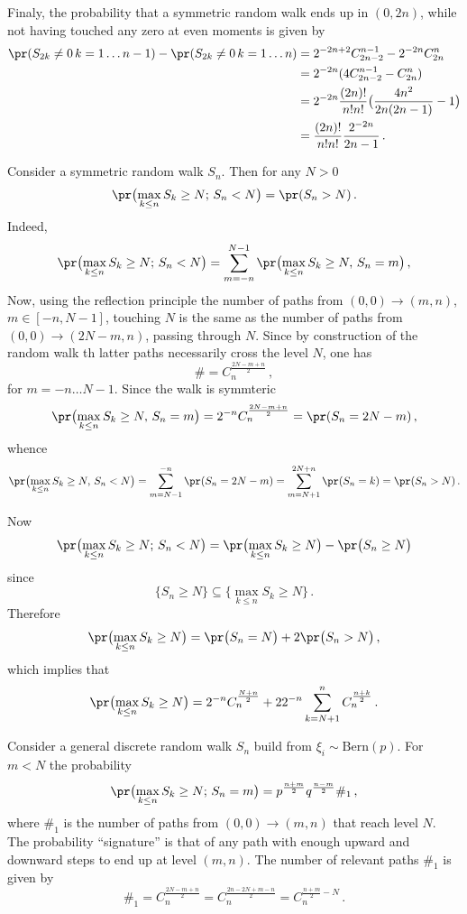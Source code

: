 Finaly, the probability that a symmetric random walk ends up in $(0,2n)$, while
not having touched any zero at even moments is given by
\begin{align*}
	\pr(S_{2k}\neq 0\,k=1\ldots n-1) - \pr(S_{2k}\neq 0\,k=1\ldots n) 
		&= 2^{-2n+2} C_{2n-2}^{n-1} - 2^{-2n} C_{2n}^n \\
		&= 2^{-2n} ( 4 C_{2n-2}^{n-1} - C_{2n}^n) \\
		&= 2^{-2n} \frac{(2n)!}{n!n!}\bigl(\frac{4 n^2}{2n(2n-1)}-1\bigr) \\
		&= \frac{(2n)!}{n!n!}\frac{2^{-2n}}{2n-1} \,.
\end{align*}

Consider a symmetric random walk $S_n$. Then for any $N > 0$
\[ \pr\bigl( \max_{k\leq n} S_k \geq N;\, S_n < N \bigr) = \pr( S_n > N ) \,. \]
Indeed,
\[ \pr\bigl( \max_{k\leq n} S_k \geq N;\, S_n < N \bigr)
	= \sum_{m=-n}^{N-1} \pr\bigl( \max_{k\leq n} S_k \geq N,\, S_n = m \bigr) \,, \]
Now, using the reflection principle the number of paths from $(0,0)\to(m,n)$, $m\in [-n,N-1]$,
touching $N$ is the same as the number of paths from $(0,0)\to (2N-m,n)$, passing
through $N$. Since by construction of the random walk th latter paths necessarily cross
the level $N$, one has
\[ \# = C_n^\frac{2N-m+n}{2} \,, \]
for $m=-n\ldots N-1$. Since the walk is symmteric 
\[ \pr\bigl( \max_{k\leq n} S_k \geq N,\, S_n = m \bigr)
	= 2^{-n} C_n^\frac{2N-m+n}{2} = \pr( S_n = 2N-m ) \,, \]
whence
\[ \pr\bigl( \max_{k\leq n} S_k \geq N,\, S_n < N \bigr)
	= \sum_{m=N-1}^{-n} \pr( S_n = 2N-m )
	= \sum_{m=N+1}^{2N+n} \pr( S_n = k )
	= \pr( S_n > N ) \,. \]

Now
\begin{align*}
	\pr\bigl( \max_{k\leq n} S_k \geq N;\, S_n < N \bigr)
		&= \pr\bigl( \max_{k\leq n} S_k \geq N \bigr)
		 - \pr\bigl( S_n \geq N \bigr) \\
\end{align*}
since 
\[ \{ S_n \geq N \} \subseteq \{ \max_{k\leq n} S_k \geq N \}\,. \]
Therefore
\[ \pr\bigl( \max_{k\leq n} S_k \geq N \bigr)
	= \pr\bigl( S_n = N \bigr) + 2\pr\bigl( S_n > N \bigr) \,, \]
which implies that
\[ \pr\bigl( \max_{k\leq n} S_k \geq N \bigr)
	= 2^{-n} C_n^\frac{N+n}{2}
		+ 2 2^{-n} \sum_{k=N+1}^n C_n^\frac{n+k}{2} \,. \]

Consider a general discrete random walk $S_n$ build from $\xi_i\sim\text{Bern}(p)$.
For $m<N$ the probability
\[ \pr\bigl( \max_{k\leq n} S_k \geq N;\,S_n = m \bigr)
	= p^\frac{n+m}{2} q^\frac{n-m}{2} \#_1 \,,\]
where $\#_1$ is the number of paths from $(0,0)\to(m,n)$ that reach level $N$.
The probability ``signature'' is that of any path with enough upward and downward
steps to end up at level $(m,n)$. The number of relevant paths $\#_1$ is given by
\[ \#_1 = C_n^\frac{2N-m+n}{2}
		= C_n^\frac{2n-2N+m-n}{2}
		= C_n^{\frac{n+m}{2}-N} \,. \]


